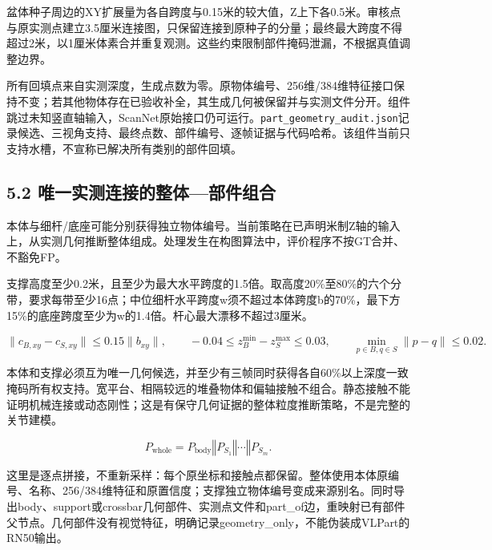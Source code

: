 \documentclass[UTF8,fontset=fandol]{ctexart}
\begin{document}
盆体种子周边的XY扩展量为各自跨度与0.15米的较大值，Z上下各0.5米。审核点与原实测点建立3.5厘米连接图，只保留连接到原种子的分量；最终最大跨度不得超过2米，以1厘米体素合并重复观测。这些约束限制部件掩码泄漏，不根据真值调整边界。



所有回填点来自实测深度，生成点数为零。原物体编号、256维/384维特征接口保持不变；若其他物体存在已验收补全，其生成几何被保留并与实测文件分开。组件跳过未知竖直轴输入，ScanNet原始接口仍可运行。\texttt{part\_\allowbreak{}geometry\_\allowbreak{}audit.\allowbreak{}json}记录候选、三视角支持、最终点数、部件编号、逐帧证据与代码哈希。该组件当前只支持水槽，不宣称已解决所有类别的部件回填。



\subsection*{5.2 唯一实测连接的整体—部件组合}

本体与细杆/底座可能分别获得独立物体编号。当前策略在已声明米制Z轴的输入上，从实测几何推断整体组成。处理发生在构图算法中，评价程序不按GT合并、不豁免FP。



支撑高度至少0.2米，且至少为最大水平跨度的1.5倍。取高度20\%至80\%的六个分带，要求每带至少16点；中位细杆水平跨度w须不超过本体跨度b的70\%，最下方15\%的底座跨度至少为w的1.4倍。杆心最大漂移不超过3厘米。



\[
\|c_{B,xy}-c_{S,xy}\|\le0.15\|b_{xy}\|,\qquad
-0.04\le z_B^{\min}-z_S^{\max}\le0.03,\qquad
\min_{p\in B,q\in S}\|p-q\|\le0.02.
\]

本体和支撑必须互为唯一几何候选，并至少有三帧同时获得各自60\%以上深度一致掩码所有权支持。宽平台、相隔较远的堆叠物体和偏轴接触不组合。静态接触不能证明机械连接或动态刚性；这是有保守几何证据的整体粒度推断策略，不是完整的关节建模。



\[
P_{\mathrm{whole}}=P_{\mathrm{body}}\mathbin{\Vert}P_{S_1}\mathbin{\Vert}\cdots\mathbin{\Vert}P_{S_m}.
\]

这里是逐点拼接，不重新采样：每个原坐标和接触点都保留。整体使用本体原编号、名称、256/384维特征和原置信度；支撑独立物体编号变成来源别名。同时导出body、support或crossbar几何部件、实测点文件和part\_of边，重映射已有部件父节点。几何部件没有视觉特征，明确记录geometry\_only，不能伪装成VLPart的RN50输出。
\end{document}
